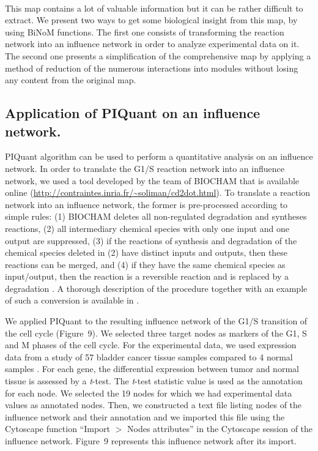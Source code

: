 \documentclass[11pt]{bmc_article_s50}
\newenvironment{bmcformat}{\begin{raggedright}\baselineskip20pt\sloppy\setboolean{publ}{false}}{\end{raggedright}\baselineskip20pt\sloppy}
\begin{document}
\begin{bmcformat}
\hrulefill\



This map contains a lot of valuable information but it can be rather difficult to extract. We present two
ways to get some biological insight from this map, by using BiNoM functions. The first one consists of
transforming the reaction network into an influence network in order to analyze
experimental data on it. The second one presents a simplification of the comprehensive map by
applying a method of reduction of the numerous interactions into modules without
losing any content from the original map.

\subsection*{Application of PIQuant on an influence network.}
PIQuant algorithm can be used to perform a quantitative analysis on an influence
network. In order to translate the G1/S reaction network into an influence network, we used
a tool developed by the team of BIOCHAM \cite{calzone2006biocham} that is
available online (\url{http://contraintes.inria.fr/~soliman/cd2dot.html}). To
translate a reaction network into an influence network, the former is
pre-processed according to simple rules: (1) BIOCHAM deletes all non-regulated
degradation and syntheses reactions, (2) all intermediary chemical species with
only one input and
one output are suppressed, (3) if the reactions of synthesis and degradation of
the chemical species deleted in (2) have distinct inputs and outputs, then these
reactions
can be merged, and (4) if they have the same chemical species as input/output,
then the reaction is a
reversible reaction and is replaced by a degradation \cite{fages2008frontiers}.
A thorough description of the procedure together with an example of such a
conversion is
available in \cite{calzone2011calamar}.{\pagebreak} 

We applied PIQuant to the resulting influence network of the G1/S transition of
the cell cycle (Figure~9). We selected three target nodes as
markers of the G1, S and M
phases of the cell cycle. For the experimental data, we used expression data
from a study of 57 bladder cancer
tissue samples compared to 4 normal samples \cite{stransky2006regional}. For
each gene, the differential expression between tumor and normal tissue
is assessed by a \textit{t}-test. The \textit{t}-test statistic value is used as the annotation
for each node. We selected the 19 nodes for which we had experimental data
values as annotated nodes. Then, we constructed a text file listing nodes of the influence network
and their annotation and we imported this file using the Cytoscape function
``Import $>$ Nodes attributes''
in the Cytoscape session of the influence network.
Figure~9 represents this influence network after its import.


\end{bmcformat}
\end{document}
